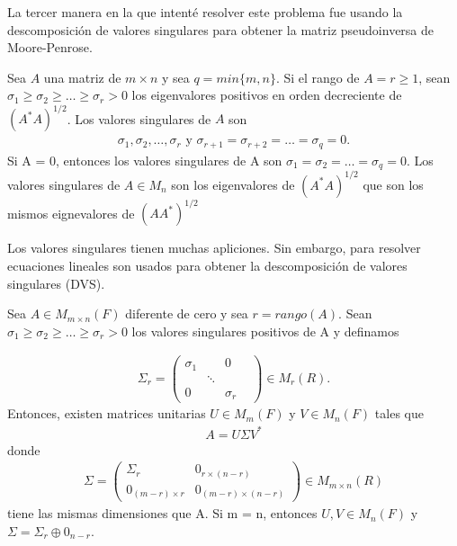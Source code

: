 La tercer manera en la que intenté resolver este problema fue usando la descomposición de valores singulares para obtener la matriz pseudoinversa de Moore-Penrose. 

\begin{definition}
Sea $A$ una matriz de $m \times n$ y sea $q = min \{m, n \}$. Si el rango de $A = r \geq 1$, sean $\sigma_1 \geq \sigma_2 \geq \dots \geq \sigma_r > 0$ los eigenvalores positivos en orden decreciente de $(A^{*}A)^{1/2}$. Los valores singulares de $A$ son
\begin{equation*}
    \begin{aligned}
    \sigma_1, \sigma_2, \dots, \sigma_r \text{ y } \sigma_{r+1} = \sigma_{r+2} = \dots = \sigma_q = 0.
    \end{aligned}
\end{equation*}
Si A = 0, entonces los valores singulares de A son $\sigma_1 = \sigma_2 = \dots = \sigma_q = 0$. 
Los valores singulares de $A \in M_{n}$ son los eigenvalores de $(A^{*}A)^{1/2}$ que son los mismos eignevalores de $(AA^{*})^{1/2}$
\cite[p.~420]{garcia2017second}
\end{definition}

Los valores singulares tienen muchas apliciones. Sin embargo, para resolver ecuaciones lineales son usados para obtener la descomposición de valores singulares (DVS). 


\begin{theorem}
Sea $A \in M_{m \times n} (F)$ diferente de cero y sea $r =   rango(A)$. Sean $\sigma_1 \geq \sigma_2 \geq \dots \geq \sigma_r > 0$ los valores singulares positivos de A y definamos

\begin{equation*}
    \begin{aligned}
    \Sigma_r = 
    \begin{pmatrix}
    \sigma_1 & & 0 \\
     & \ddots & & \\
     0 & & \sigma_r
    \end{pmatrix}
    \in M_{r}(R).
    \end{aligned}
\end{equation*}
Entonces, existen matrices unitarias $U \in M_{m}(F)$ y $V \in M_{n}(F)$ tales que 
\begin{equation} \label{decomposicion}
    \begin{aligned}
    A = U \Sigma V^{*}
    \end{aligned}
\end{equation}
donde
\begin{equation*}
    \begin{aligned}
    \Sigma = 
    \begin{pmatrix}
    \Sigma_r & 0_{r \times (n-r)} \\
    0_{(m-r) \times r} & 0_{(m-r) \times (n-r)}
    \end{pmatrix}
    \in M_{m \times n}(R)
    \end{aligned}
\end{equation*}
 tiene las mismas dimensiones que A. Si m = n, entonces $U, V \in M_{n}(F)$ y $\Sigma = \Sigma_r \oplus 0_{n-r}$.
 \cite[p.~421]{garcia2017second}
\end{theorem}

